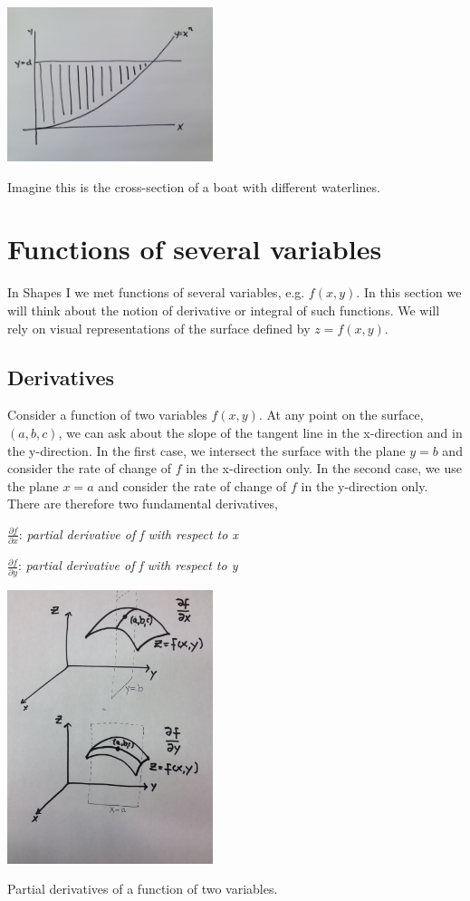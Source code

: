 \documentclass{tufte-handout}
\begin{document}
\begin{marginfigure}
\includegraphics[width=6cm]{figs/areadepth}
\caption{Imagine this is the cross-section of a boat with different waterlines.}
\end{marginfigure}

\section{Functions of several variables}
In Shapes I we met functions of several variables, e.g. $f(x,y)$. In this section we will think about the notion of derivative or integral of such functions. We will rely on visual representations of the surface defined by $z=f(x,y)$. 

\subsection{Derivatives}
Consider a function of two variables $f(x,y)$. At any point on the surface, $(a,b,c)$, we can ask about the slope of the tangent line in the x-direction and in the y-direction. In the first case, we intersect the surface with the plane $y=b$ and consider the rate of change of $f$ in the x-direction only. In the second case, we use the plane $x=a$ and consider the rate of change of $f$ in the y-direction only. There are therefore two fundamental derivatives, 

$\frac{\partial f}{\partial x}$: {\it partial derivative of f with respect to x}

$\frac{\partial f}{\partial y}$: {\it partial derivative of f with respect to y}

\begin{marginfigure}
\includegraphics[width=6cm]{figs/partial_derivs}
\caption{Partial derivatives of a function of two variables.}
\end{marginfigure}
\end{document}
